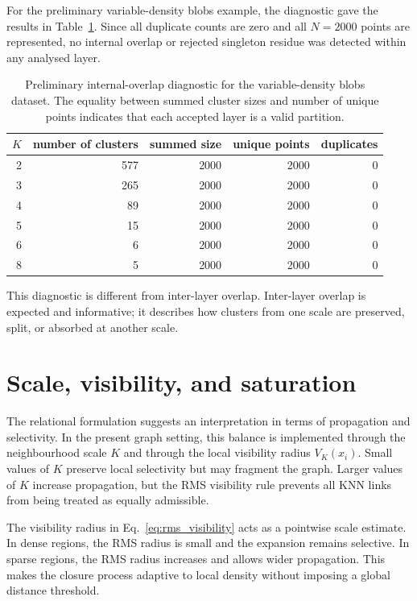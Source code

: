 \documentclass[pdflatex,sn-mathphys-num]{sn-jnl}
\begin{document}
For the preliminary variable-density blobs example, the diagnostic gave the results in Table~\ref{tab:partition_diagnostic}. Since all duplicate counts are zero and all $N=2000$ points are represented, no internal overlap or rejected singleton residue was detected within any analysed layer.

\begin{table}[t]
\caption{Preliminary internal-overlap diagnostic for the variable-density blobs dataset. The equality between summed cluster sizes and number of unique points indicates that each accepted layer is a valid partition.}\label{tab:partition_diagnostic}
\centering
\begin{tabular}{rrrrr}
\toprule
$K$ & number of clusters & summed size & unique points & duplicates\\
\midrule
2 & 577 & 2000 & 2000 & 0\\
3 & 265 & 2000 & 2000 & 0\\
4 & 89  & 2000 & 2000 & 0\\
5 & 15  & 2000 & 2000 & 0\\
6 & 6   & 2000 & 2000 & 0\\
8 & 5   & 2000 & 2000 & 0\\
\bottomrule
\end{tabular}
\end{table}

This diagnostic is different from inter-layer overlap. Inter-layer overlap is expected and informative; it describes how clusters from one scale are preserved, split, or absorbed at another scale.

\section{Scale, visibility, and saturation}\label{sec:scale}

The relational formulation suggests an interpretation in terms of propagation and selectivity. In the present graph setting, this balance is implemented through the neighbourhood scale $K$ and through the local visibility radius $V_K(x_i)$. Small values of $K$ preserve local selectivity but may fragment the graph. Larger values of $K$ increase propagation, but the RMS visibility rule prevents all KNN links from being treated as equally admissible.

The visibility radius in Eq.~\eqref{eq:rms_visibility} acts as a pointwise scale estimate. In dense regions, the RMS radius is small and the expansion remains selective. In sparse regions, the RMS radius increases and allows wider propagation. This makes the closure process adaptive to local density without imposing a global distance threshold.
\end{document}
